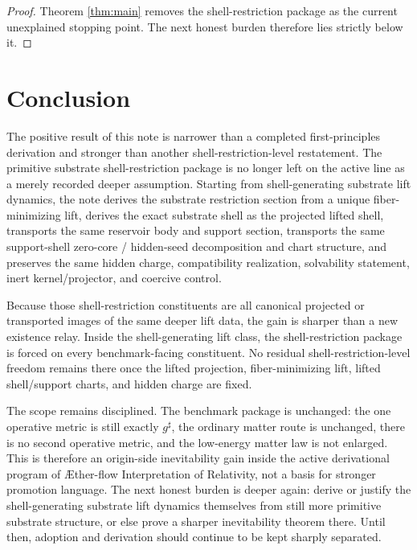 \documentclass[11pt]{article}
\newcommand{\Aflow}{\AE{}ther-flow}
\newcommand{\TheoryName}{\Aflow{} Interpretation of Relativity}
\newcommand{\CompletedMetric}{g^{\sharp}}
\begin{document}
\begin{proof}
Theorem \ref{thm:main} removes the shell-restriction package as the current unexplained stopping point. The next honest burden therefore lies strictly below it.
\end{proof}

\section{Conclusion}

The positive result of this note is narrower than a completed first-principles derivation and stronger than another shell-restriction-level restatement. The primitive substrate shell-restriction package is no longer left on the active line as a merely recorded deeper assumption. Starting from shell-generating substrate lift dynamics, the note derives the substrate restriction section from a unique fiber-minimizing lift, derives the exact substrate shell as the projected lifted shell, transports the same reservoir body and support section, transports the same support-shell zero-core / hidden-seed decomposition and chart structure, and preserves the same hidden charge, compatibility realization, solvability statement, inert kernel/projector, and coercive control.

Because those shell-restriction constituents are all canonical projected or transported images of the same deeper lift data, the gain is sharper than a new existence relay. Inside the shell-generating lift class, the shell-restriction package is forced on every benchmark-facing constituent. No residual shell-restriction-level freedom remains there once the lifted projection, fiber-minimizing lift, lifted shell/support charts, and hidden charge are fixed.

The scope remains disciplined. The benchmark package is unchanged: the one operative metric is still exactly \(\CompletedMetric\), the ordinary matter route is unchanged, there is no second operative metric, and the low-energy matter law is not enlarged. This is therefore an origin-side inevitability gain inside the active derivational program of \TheoryName{}, not a basis for stronger promotion language. The next honest burden is deeper again: derive or justify the shell-generating substrate lift dynamics themselves from still more primitive substrate structure, or else prove a sharper inevitability theorem there. Until then, adoption and derivation should continue to be kept sharply separated.
\end{document}
